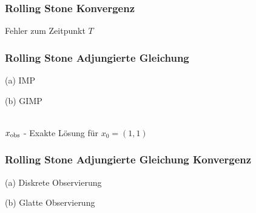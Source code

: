 \begin{frame}[<+->]
\frametitle{Rolling Stone Konvergenz}
\centering
%  
%  
\begin{minipage}[c]{0.49\textwidth}
\centering
 
\end{minipage}
\begin{minipage}[c]{0.49\textwidth}
\centering
 
\end{minipage}
\centering
Fehler zum Zeitpunkt $T$
\end{frame}

\begin{frame}[<+->]
\frametitle{Rolling Stone Adjungierte Gleichung}
\begin{minipage}[c]{0.45\textwidth}
\centering
 
(a) IMP
\end{minipage}
\begin{minipage}[c]{0.45\textwidth}
\centering

(b) GIMP
\end{minipage}
\hfill
\centering
\\[0.6cm]
$x_\text{obs}$ - Exakte Lösung für $x_0=(1,1)$
\end{frame}

\begin{frame}[<+->]
\frametitle{Rolling Stone Adjungierte Gleichung Konvergenz}
\centering
\begin{minipage}[c]{0.49\textwidth}
\centering
 
(a) Diskrete Observierung
\end{minipage}
\hfill
\begin{minipage}[c]{0.49\textwidth}
\centering
 
(b) Glatte Observierung
\end{minipage}

\end{frame}

